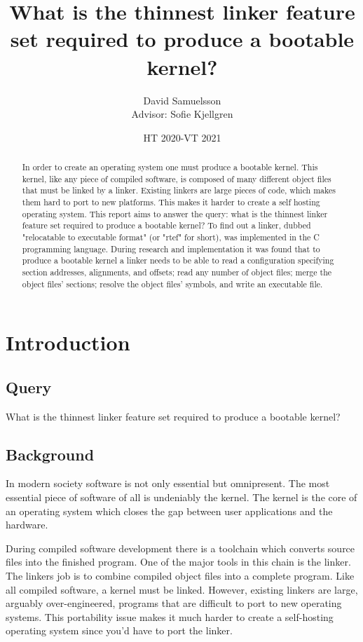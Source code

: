 \documentclass{article}
\title{What is the thinnest linker feature set required to produce a bootable kernel?}
\author{David Samuelsson \\
	{\small Advisor: Sofie Kjellgren}}
\affil{NTI Johanneberg}
\date{HT 2020-VT 2021}
\begin{document}
\maketitle

\begin{abstract}

In order to create an operating system one must produce a bootable kernel. This kernel, like any piece of compiled software, is composed of many different object files that must be linked by a linker. Existing linkers are large pieces of code, which makes them hard to port to new platforms. This makes it harder to create a self hosting operating system. This report aims to answer the query: what is the thinnest linker feature set required to produce a bootable kernel? To find out a linker, dubbed "relocatable to executable format" (or "rtef" for short), was implemented in the C programming language. During research and implementation it was found that to produce a bootable kernel a linker needs to be able to read a configuration specifying section addresses, alignments, and offsets; read any number of object files; merge the object files' sections; resolve the object files' symbols, and write an executable file.
\end{abstract}

\tableofcontents
\newpage

\section{Introduction}

\subsection{Query}

What is the thinnest linker feature set required to produce a bootable kernel?

\subsection{Background}

In modern society software is not only essential but omnipresent. The most essential piece of software of all is undeniably the kernel. The kernel is the core of an operating system which closes the gap between user applications and the hardware.

During compiled software development there is a toolchain which converts source files into the finished program. One of the major tools in this chain is the linker. The linkers job is to combine compiled object files into a complete program. Like all compiled software, a kernel must be linked. However, existing linkers are large, arguably over-engineered, programs that are difficult to port to new operating systems. This portability issue makes it much harder to create a self-hosting operating system since you'd have to port the linker.
\end{document}
